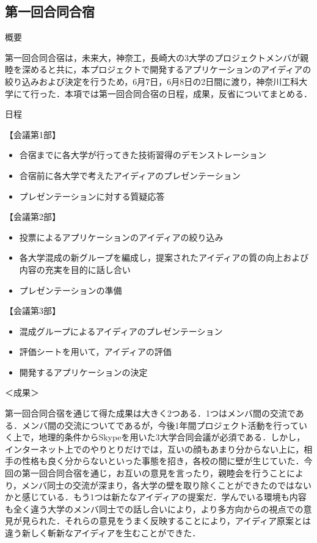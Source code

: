 \subsection{第一回合同合宿}
\par
概要
\par
第一回合同合宿は，未来大，神奈工，長崎大の3大学のプロジェクトメンバが親睦を深めると共に，本プロジェクトで開発するアプリケーションのアイディアの絞り込みおよび決定を行うため，6月7日，6月8日の2日間に渡り，神奈川工科大学にて行った．本項では第一回合同合宿の日程，成果，反省についてまとめる．
\par
日程
\par
【会議第1部】
\begin{itemize}
\item 合宿までに各大学が行ってきた技術習得のデモンストレーション
\item 合宿前に各大学で考えたアイディアのプレゼンテーション
\item プレゼンテーションに対する質疑応答
\end{itemize}
【会議第2部】
\begin{itemize}
\item 投票によるアプリケーションのアイディアの絞り込み
\item 各大学混成の新グループを編成し，提案されたアイディアの質の向上および内容の充実を目的に話し合い
\item プレゼンテーションの準備
\end{itemize}
【会議第3部】
\begin{itemize}
\item 混成グループによるアイディアのプレゼンテーション
\item 評価シートを用いて，アイディアの評価
\item 開発するアプリケーションの決定
\end{itemize}
＜成果＞
\par
第一回合同合宿を通じて得た成果は大きく2つある．1つはメンバ間の交流である．メンバ間の交流についてであるが，今後1年間プロジェクト活動を行っていく上で，地理的条件からSkypeを用いた3大学合同会議が必須である．しかし，インターネット上でのやりとりだけでは，互いの顔もあまり分からない上に，相手の性格も良く分からないといった事態を招き，各校の間に壁が生じていた．今回の第一回合同合宿を通じ，お互いの意見を言ったり，親睦会を行うことにより，メンバ同士の交流が深まり，各大学の壁を取り除くことができたのではないかと感じている．もう1つは新たなアイディアの提案だ．学んでいる環境も内容も全く違う大学のメンバ同士での話し合いにより，より多方向からの視点での意見が見られた．それらの意見をうまく反映することにより，アイディア原案とは違う新しく斬新なアイディアを生むことができた．
